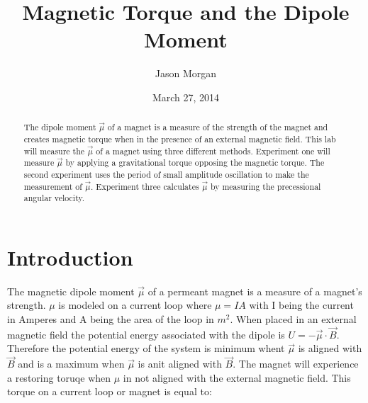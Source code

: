 \documentclass[twocolumn,secnumarabic,amssymb, nobibnotes, aps, pra]{revtex4}
\begin{document}
\title{Magnetic Torque and the Dipole Moment
 }


\author{Jason Morgan}



\date{March 27, 2014}


\begin{abstract}
The dipole moment $\vec{\mu}$ of a magnet is a measure of the strength of the magnet and creates magnetic torque when in the presence of an external magnetic field.  This lab will measure the $\vec{\mu}$ of a magnet using three different methods.  Experiment one will measure $\vec{\mu}$ by applying a gravitational torque opposing the magnetic torque.  The second experiment uses the period of small amplitude oscillation to make the measurement of $\vec{\mu}$.  Experiment three calculates $\vec{\mu}$ by measuring the precessional angular velocity.  
\end{abstract}

\maketitle
\section{Introduction}

The magnetic dipole moment $\vec{\mu}$ of a permeant magnet is a measure of a magnet’s strength.   $\mu$ is modeled on a current loop where $\mu = IA$ with I being the current in Amperes and A being the area of the loop in $m^2$.  When placed in an external magnetic field the potential energy associated with the dipole is $U = - \vec{\mu} \cdot \vec{B}$.  Therefore the potential energy of the system is minimum whent $\vec{\mu}$ is aligned with $\vec{B}$ and is a maximum when $\vec{\mu}$ is anit aligned with $\vec{B}$.  The magnet will experience a restoring toruqe when $\mu$ in not aligned with the external magnetic field.  This torque on a current loop or magnet is equal to: 
\end{document}
